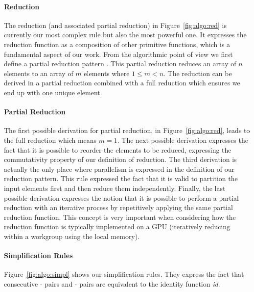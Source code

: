 \paragraph{Reduction}
The reduction (and associated partial reduction) in Figure~\ref{fig:algo:red} is currently our most complex rule but also the most powerful one.
It expresses the reduction function as a composition of other primitive functions, which is a fundamental aspect of our work.
From the algorithmic point of view we first define a partial reduction pattern .
This partial reduction reduces an array of $n$ elements to an array of $m$ elements where $1 \leq m < n$.
The reduction can be derived in a partial reduction combined with a full reduction which ensures we end up with one unique element.

\paragraph{Partial Reduction}
The first possible derivation for partial reduction, in Figure~\ref{fig:algo:red}, leads to the full reduction which means $m=1$.
The next possible derivation expresses the fact that it is possible to reorder the elements to be reduced, expressing the commutativity property of our definition of reduction.
The third derivation is actually the only place where parallelism is expressed in the definition of our reduction pattern.
This rule expressed the fact that it is valid to partition the input elements first and then reduce them independently.
Finally, the last possible derivation expresses the notion that it is possible to perform a partial reduction with an iterative process by repetitively applying the same partial reduction function.
This concept is very important when considering how the reduction function is typically implemented on a GPU (iteratively reducing within a workgroup using the local memory).


\paragraph{Simplification Rules}
Figure~\ref{fig:algo:simpl} shows our simplification rules.
They express the fact that consecutive - pairs and - pairs are equivalent to the identity function \emph{id}.

